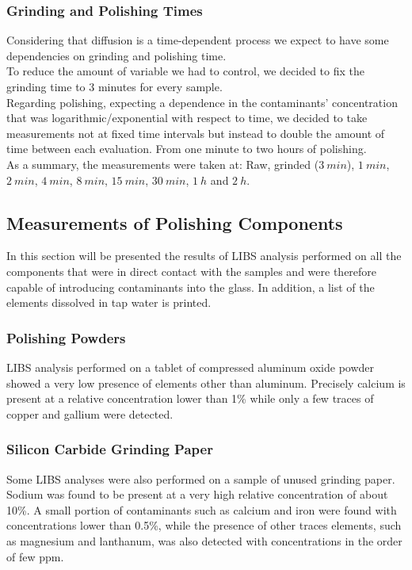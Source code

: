 \subsubsection{Grinding and Polishing Times}
\label{subsubsec:grinding_pol_times}
Considering that diffusion is a time-dependent process we expect to have some dependencies on grinding and polishing time.
\\
To reduce the amount of variable we had to control, we decided to fix the grinding time to 3 minutes for every sample.
\\
Regarding polishing, expecting a dependence in the contaminants' concentration that was logarithmic/exponential with respect to time, we decided to take measurements not at fixed time intervals but instead to double the amount of time between each evaluation. From one minute to two hours of polishing.
\\
As a summary, the measurements were taken at: 
Raw, grinded ($3\: min$), $1\: min$, $2\: min$, $4\: min$, $8\: min$, $15\: min$, $30\: min$, $1\: h$ and $2\: h$.

\subsection{Measurements of Polishing Components}
\label{subsec:measurements_pol_components}
In this section will be presented the results of LIBS analysis performed on all the components that were in direct contact with the samples and were therefore capable of introducing contaminants into the glass. In addition, a list of the elements dissolved in tap water is printed.

\subsubsection{Polishing Powders}
\label{subsubsec:meas_pol_powders}
LIBS analysis performed on a tablet of compressed aluminum oxide powder showed a very low presence of elements other than aluminum. Precisely calcium is present at a relative concentration lower than 1\% while only a few traces of copper and gallium were detected.

\subsubsection{Silicon Carbide Grinding Paper}
\label{subsubsec:grinding_paper_meas}
Some LIBS analyses were also performed on a sample of unused grinding paper. Sodium was found to be present at a very high relative concentration of about 10\%. A small portion of contaminants such as calcium and iron were found with concentrations lower than 0.5\%, while the presence of other traces elements, such as magnesium and lanthanum, was also detected with concentrations in the order of few ppm.

